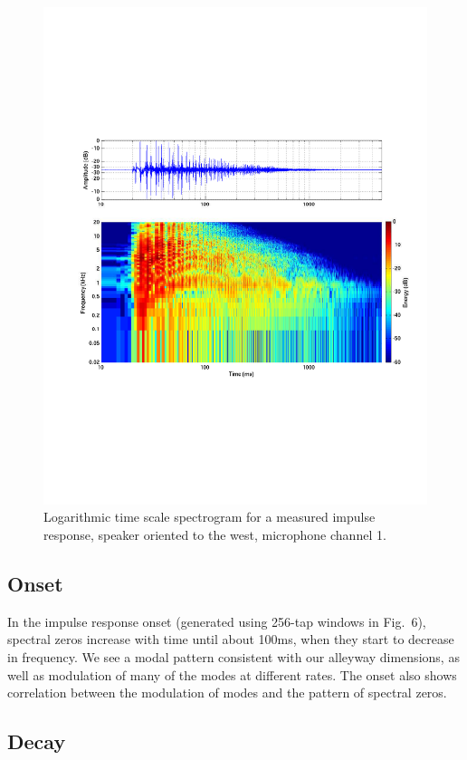 \documentclass{aes137}
\begin{document}
\begin{figure}[h!] \centering \includegraphics[width=\linewidth]{images/P14IR_irsg_cropped.pdf} \caption{Logarithmic time scale spectrogram for a measured impulse response, speaker oriented to the west, microphone channel 1.} \end{figure}

\subsection{Onset}
In the impulse response onset (generated using 256-tap windows in Fig.~6), spectral zeros increase with time until about 100ms, when they start to decrease in frequency. We see a modal pattern consistent with our alleyway dimensions, as well as modulation of many of the modes at different rates. The onset also shows correlation between the modulation of modes and the pattern of spectral zeros.

\subsection{Decay}
\end{document}
